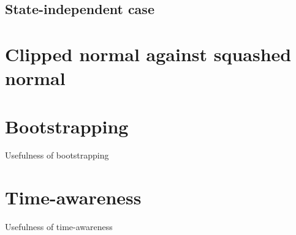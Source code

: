 

\subsection{State-independent case}

\section{Clipped normal against squashed normal}

\section{Bootstrapping}

Usefulness of bootstrapping

\section{Time-awareness}

Usefulness of time-awareness